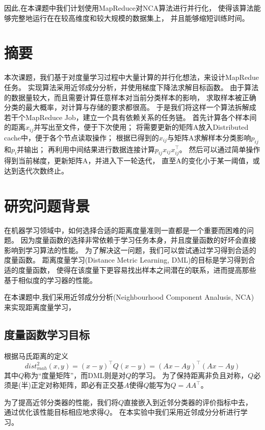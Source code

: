 \documentclass[a4paper,UTF8]{article}
\theoremstyle{definition}
\begin{document}
因此,在本课题中我们计划使用MapReduce对NCA算法进行并行化，
使得该算法能够完整地运行在在较高维度和较大规模的数据集上，
并且能够缩短训练时间。

\section*{摘要}

本次课题，我们基于对度量学习过程中大量计算的并行化想法，来设计MapRedue任务。
实现算法采用近邻成分分析，并使用梯度下降法求解目标函数。
由于算法的数据量较大，而且需要计算任意样本对当前分类样本的影响，
求取样本被正确分类的最大概率，对计算与存储的要求都很高。
于是我们将这样一个算法拆解成若干个MapReduce Job，建立一个具有依赖关系的任务链。
首先计算各个样本间的距离$x_{ij}$并写出至文件，便于下次使用；
将需要更新的矩阵A放入Distributed cache中，便于各个节点读取操作；
根据已得到的$x_{ij}$与矩阵A求解样本分类影响$p_{ij}$和$p_{i}$并输出；
再利用中间结果进行数据连接计算$p_{ij} x_{ij} x_{ij}^\top$。
然后可以通过简单操作得到当前梯度，更新矩阵A，并进入下一轮迭代，
直至A的变化小于某一阈值，或达到迭代次数终止。

\section*{研究问题背景}

在机器学习领域中，如何选择合适的距离度量准则一直都是一个重要而困难的问题。
因为度量函数的选择非常依赖于学习任务本身，并且度量函数的好坏会直接影响到学习算法的性能。
为了解决这一问题，我们可以尝试通过学习得到合适的度量函数。
距离度量学习(Distance Metric Learning, DML)的目标是学习得到合适的度量函数，
使得在该度量下更容易找出样本之间潜在的联系，进而提高那些基于相似度的学习器的性能。

在本课题中,我们采用近邻成分分析(Neighbourhood Component Analusis, NCA)来实现距离度量学习，

\subsection*{度量函数学习目标}

根据马氏距离的定义
\[
	dist_{mah}^2(x, y) = (x - y)^\top Q(x - y) = (Ax - Ay)^\top (Ax - Ay)
\]
其中$Q$称为“度量矩阵”，而DML则是对$Q$的学习。
为了保持距离非负且对称，$Q$必须是(半)正定对称矩阵，即必有正交基$A$使得$Q$能写为$Q = AA^\top$。

为了提高近邻分类器的性能，我们将$Q$直接嵌入到近邻分类器的评价指标中去，
通过优化该性能目标相应地求得$Q$。
在本实验中我们采用近邻成分分析进行学习。
\end{document}
